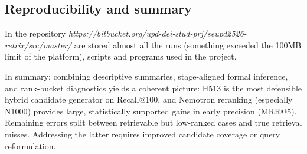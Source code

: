 \subsection{Reproducibility and summary}
In the repository \textit{https://bitbucket.org/upd-dei-stud-prj/seupd2526-retrix/src/master/} are stored almost all the runs (something exceeded the 100MB limit of the platform), scripts and programs used in the project.

In summary: combining descriptive summaries, stage-aligned formal inference, and rank-bucket diagnostics yields a coherent picture: H513 is the most defensible hybrid candidate generator on Recall@100, and Nemotron reranking (especially N1000) provides large, statistically supported gains in early precision (MRR@5). Remaining errors split between retrievable but low-ranked cases and true retrieval misses. Addressing the latter requires improved candidate coverage or query reformulation.